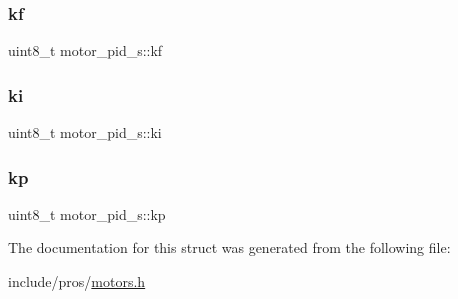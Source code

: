 \mbox{\label{structmotor__pid__s_aad53ebe7d1c645811b3dc6cb825bd590}} 
\subsubsection{\texorpdfstring{kf}{kf}}
{\footnotesize\ttfamily uint8\+\_\+t motor\+\_\+pid\+\_\+s\+::kf}

\mbox{\label{structmotor__pid__s_ac894dd6c3683c2daa403b81e259a1cae}} 
\subsubsection{\texorpdfstring{ki}{ki}}
{\footnotesize\ttfamily uint8\+\_\+t motor\+\_\+pid\+\_\+s\+::ki}

\mbox{\label{structmotor__pid__s_a31c38ff6a4245e81c4db42579b90be31}} 
\subsubsection{\texorpdfstring{kp}{kp}}
{\footnotesize\ttfamily uint8\+\_\+t motor\+\_\+pid\+\_\+s\+::kp}



The documentation for this struct was generated from the following file\+:\begin{DoxyCompactItemize}
\item 
include/pros/\mbox{\hyperlink{motors_8h}{motors.\+h}}\end{DoxyCompactItemize}
